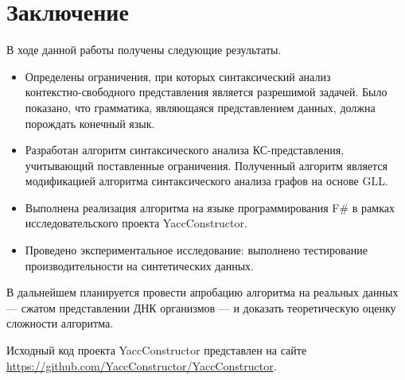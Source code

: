 \section*{Заключение}

В ходе данной работы получены следующие результаты.

\begin{itemize}
	\item Определены ограничения, при которых синтаксический анализ \\ контекстно-свободного представления является разрешимой задачей. Было показано, что грамматика, являющаяся представлением данных, должна порождать конечный язык.
	\item Разработан алгоритм синтаксического анализа КС-представления, учитывающий поставленные ограничения. Полученный алгоритм является модификацией алгоритма синтаксического анализа графов на основе GLL.
	\item Выполнена реализация алгоритма на языке программирования F$\#$ в рамках исследовательского проекта YaccConstructor.
	\item Проведено экспериментальное исследование: выполнено тестирование производительности на синтетических данных.
\end{itemize}  

В дальнейшем планируется провести апробацию алгоритма на реальных данных --- сжатом представлении ДНК организмов --- и доказать теоретическую оценку сложности алгоритма.

Исходный код проекта YaccConstructor представлен на сайте \linebreak  \url{https://github.com/YaccConstructor/YaccConstructor}. 